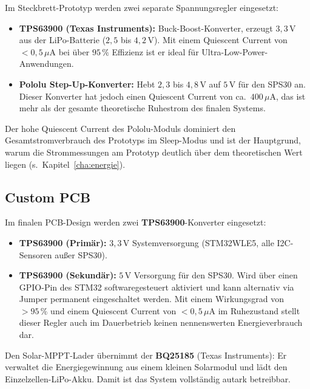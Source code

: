 Im Steckbrett-Prototyp werden zwei separate Spannungsregler eingesetzt:

\begin{itemize}
  \item \textbf{TPS63900 (Texas Instruments):} Buck-Boost-Konverter, erzeugt $3{,}3\,\text{V}$ aus der LiPo-Batterie ($2{,}5$ bis $4{,}2\,\text{V}$). Mit einem Quiescent Current von $<0{,}5\,\mu\text{A}$ bei über $95\,\%$ Effizienz ist er ideal für Ultra-Low-Power-Anwendungen.
  \item \textbf{Pololu Step-Up-Konverter:} Hebt $2{,}3$ bis $4{,}8\,\text{V}$ auf $5\,\text{V}$ für den SPS30 an. Dieser Konverter hat jedoch einen Quiescent Current von ca.\ $400\,\mu\text{A}$, das ist mehr als der gesamte theoretische Ruhestrom des finalen Systems.
\end{itemize}

Der hohe Quiescent Current des Pololu-Moduls dominiert den Gesamtstromverbrauch des Prototyps im Sleep-Modus und ist der Hauptgrund, warum die Strommessungen am Prototyp deutlich über dem theoretischen Wert liegen (s.\ Kapitel~\ref{cha:energie}).

\subsection*{Custom PCB}

Im finalen PCB-Design werden zwei \textbf{TPS63900}-Konverter eingesetzt:

\begin{itemize}
  \item \textbf{TPS63900 (Primär):} $3{,}3\,\text{V}$ Systemversorgung (STM32WLE5, alle I2C-Sensoren außer SPS30).
  \item \textbf{TPS63900 (Sekundär):} $5\,\text{V}$ Versorgung für den SPS30. Wird über einen GPIO-Pin des STM32 softwaregesteuert aktiviert und kann alternativ via Jumper permanent eingeschaltet werden. Mit einem Wirkungsgrad von $>95\,\%$ und einem Quiescent Current von $<0{,}5\,\mu\text{A}$ im Ruhezustand stellt dieser Regler auch im Dauerbetrieb keinen nennenswerten Energieverbrauch dar.
\end{itemize}

Den Solar-MPPT-Lader übernimmt der \textbf{BQ25185} (Texas Instruments): Er verwaltet die Energiegewinnung aus einem kleinen Solarmodul und lädt den Einzelzellen-LiPo-Akku. Damit ist das System vollständig autark betreibbar.

